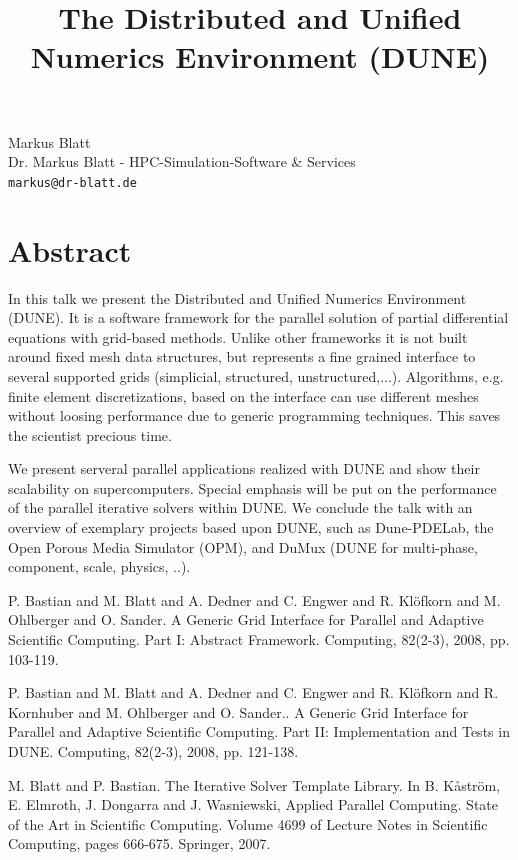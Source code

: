 \documentclass[article, A4, 11pt]{llncs}%
\begin{document}
\title{The Distributed and Unified Numerics Environment (DUNE)}
 \author{} \institute{}
\maketitle
\begin{center}
{\large Markus Blatt}\\
Dr. Markus Blatt - HPC-Simulation-Software \& Services\\
{\tt markus@dr-blatt.de}
\end{center}

\section*{Abstract}
In this talk we present the Distributed and Unified Numerics Environment (DUNE). It is a software framework for the parallel solution of partial differential equations with grid-based methods. Unlike other frameworks it is not built 
around fixed mesh data structures, but represents a fine grained interface to several supported grids (simplicial, structured, unstructured,...). Algorithms, e.g. finite element discretizations, 
based on the interface can use different meshes without loosing performance due to generic programming techniques. This saves the scientist precious time.  

We present serveral parallel applications realized with DUNE and show their scalability on supercomputers. Special emphasis will be put on the performance of the parallel iterative solvers within DUNE. We conclude the talk with an overview of exemplary projects based upon DUNE, such as Dune-PDELab, the Open Porous Media Simulator  (OPM), and DuMux (DUNE for multi-phase, component, scale, physics, ..).


\begin{thebibliography}{10}
{\sc P. Bastian and M. Blatt and A. Dedner and C. Engwer and R. Klöfkorn and M. Ohlberger and O. Sander}. {A Generic Grid Interface for Parallel and Adaptive Scientific Computing. Part I: Abstract Framework}. Computing, 82(2-3), 2008, pp. 103-119.

{\sc P. Bastian and M. Blatt and A. Dedner and C. Engwer and R. Klöfkorn and R. Kornhuber and M. Ohlberger and O. Sander.}. {A Generic Grid Interface for Parallel and Adaptive Scientific Computing. Part II: Implementation and Tests in DUNE}. Computing, 82(2-3), 2008, pp. 121-138.

{\sc M. Blatt and P. Bastian}. {The Iterative Solver Template Library}. In B. Kåström, E. Elmroth, J. Dongarra and J. Wasniewski, Applied Parallel Computing. State of the Art in Scientific Computing. Volume 4699 of Lecture Notes in Scientific Computing, pages 666-675. Springer, 2007.
\end{thebibliography} %
\end{document}
